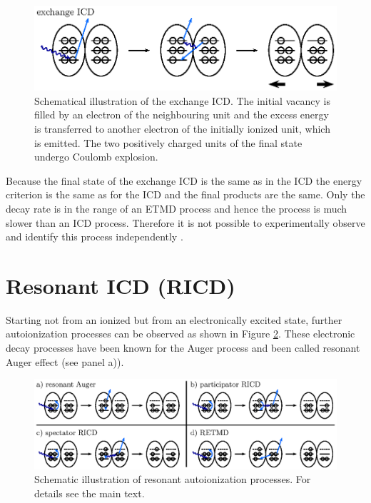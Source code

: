 \begin{figure}[h]
 \centering
 \includegraphics{pics/exicd-pspic.eps}
 \caption{Schematical illustration of the exchange \ac{ICD}. The initial
          vacancy is filled by an electron of the neighbouring unit and the
          excess energy is transferred to another electron of the initially ionized
          unit, which is emitted. The two positively charged units of the final
          state undergo Coulomb explosion.}
 \label{figure:exICD_process}
\end{figure}

Because the final state of the exchange ICD is the same as in the ICD the energy
criterion is the same as for the ICD and the final products are the same. Only
the decay rate is in the range of an ETMD process and hence the process is much
slower than an ICD process. Therefore it is not possible to experimentally
observe and identify this process independently \cite{Zobeley01}.


\section{Resonant ICD (RICD)}
Starting not from an ionized but from an electronically excited state, further
autoionization processes can be observed
as shown in Figure \ref{figure:ricd_processes}.
These electronic decay processes have been known for
the Auger process and been called resonant Auger effect (see panel a)).

\begin{figure}[h]
 \centering
 \includegraphics{pics/ricd-pspic.eps}
 \caption{Schematic illustration of resonant autoionization processes.
          For details see the main text.}
 \label{figure:ricd_processes}
\end{figure}

